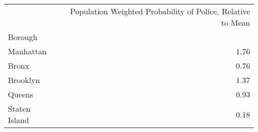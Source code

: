 \begin{tabular}{lr}
\toprule
{} &  Population Weighted Probability of Police, Relative to Mean \\
Borough       &                                                              \\
\midrule
Manhattan     &                                               1.76 \\
Bronx         &                                               0.76 \\
Brooklyn      &                                               1.37 \\
Queens        &                                               0.93 \\
Staten Island &                                               0.18 \\
\bottomrule
\end{tabular}
